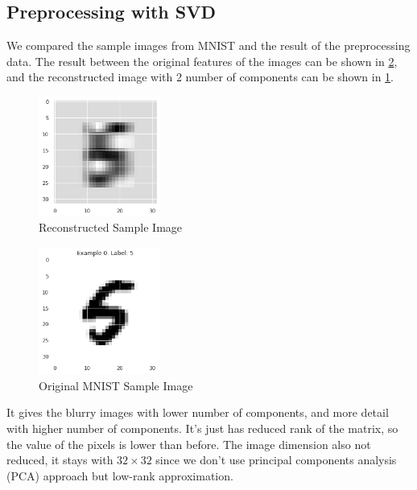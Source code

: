 \documentclass[conference]{IEEEtran}
\begin{document}
\subsection{Preprocessing with SVD}
We compared the sample images from MNIST and the result of the preprocessing data. 
The result between the original features of the images can be shown in \ref{fig:original_img}, and the reconstructed image with 2 number of components can be shown in \ref{fig:svd_2_comp}.
\begin{figure}[htbp]
    \centerline{\includegraphics[width=4cm]{SVD_2_comp.png}}
    \caption{Reconstructed Sample Image }
    \label{fig:svd_2_comp}
\end{figure}
\begin{figure}[htbp]
    \centerline{\includegraphics[width=4cm]{raw_image.png}}
    \caption{Original MNIST Sample Image}
    \label{fig:original_img}
\end{figure}
It gives the blurry images with lower number of components, and more detail with higher number of components. It's just has reduced rank of the matrix, 
so the value of the pixels is lower than before. The image dimension also not reduced, it stays with $32\times32$ since we don't use principal components analysis (PCA) approach but low-rank approximation.  
\end{document}

